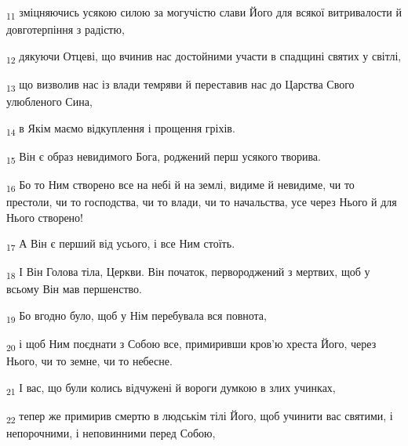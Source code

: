 \begin{tcolorbox}
\textsubscript{11} зміцняючись усякою силою за могучістю слави Його для всякої витривалости й довготерпіння з радістю,
\end{tcolorbox}
\begin{tcolorbox}
\textsubscript{12} дякуючи Отцеві, що вчинив нас достойними участи в спадщині святих у світлі,
\end{tcolorbox}
\begin{tcolorbox}
\textsubscript{13} що визволив нас із влади темряви й переставив нас до Царства Свого улюбленого Сина,
\end{tcolorbox}
\begin{tcolorbox}
\textsubscript{14} в Якім маємо відкуплення і прощення гріхів.
\end{tcolorbox}
\begin{tcolorbox}
\textsubscript{15} Він є образ невидимого Бога, роджений перш усякого творива.
\end{tcolorbox}
\begin{tcolorbox}
\textsubscript{16} Бо то Ним створено все на небі й на землі, видиме й невидиме, чи то престоли, чи то господства, чи то влади, чи то начальства, усе через Нього й для Нього створено!
\end{tcolorbox}
\begin{tcolorbox}
\textsubscript{17} А Він є перший від усього, і все Ним стоїть.
\end{tcolorbox}
\begin{tcolorbox}
\textsubscript{18} І Він Голова тіла, Церкви. Він початок, первороджений з мертвих, щоб у всьому Він мав першенство.
\end{tcolorbox}
\begin{tcolorbox}
\textsubscript{19} Бо вгодно було, щоб у Нім перебувала вся повнота,
\end{tcolorbox}
\begin{tcolorbox}
\textsubscript{20} і щоб Ним поєднати з Собою все, примиривши кров'ю хреста Його, через Нього, чи то земне, чи то небесне.
\end{tcolorbox}
\begin{tcolorbox}
\textsubscript{21} І вас, що були колись відчужені й вороги думкою в злих учинках,
\end{tcolorbox}
\begin{tcolorbox}
\textsubscript{22} тепер же примирив смертю в людськім тілі Його, щоб учинити вас святими, і непорочними, і неповинними перед Собою,
\end{tcolorbox}
